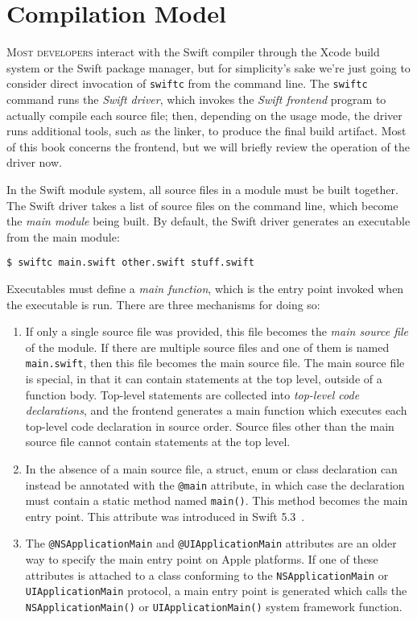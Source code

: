 \documentclass[../generics]{subfiles}
\begin{document}
\chapter{Compilation Model}\label{compilation model}

\lettrine{M}{ost developers} interact with the Swift compiler through the Xcode build system or the Swift package manager, but for simplicity's sake we're just going to consider direct invocation of \texttt{swiftc} from the command line. The \texttt{swiftc} command runs the \emph{Swift driver}, which invokes the \emph{Swift frontend} program to actually compile each source file; then, depending on the usage mode, the driver runs additional tools, such as the linker, to produce the final build artifact. Most of this book concerns the frontend, but we will briefly review the operation of the driver now.

In the Swift module system, all source files in a module must be built together. The Swift driver takes a list of source files on the command line, which become the \emph{main module} being built. By default, the Swift driver generates an executable from the main module:
\begin{Verbatim}
$ swiftc main.swift other.swift stuff.swift
\end{Verbatim}

Executables must define a \emph{main function}, which is the entry point invoked when the executable is run. There are three mechanisms for doing so:
\begin{enumerate}
\item If only a single source file was provided, this file becomes the \emph{main source file} of the module. If there are multiple source files and one of them is named \texttt{main.swift}, then this file becomes the main source file. The main source file is special, in that it can contain statements at the top level, outside of a function body. Top-level statements are collected into \emph{top-level code declarations}, and the frontend generates a main function which executes each top-level code declaration in source order. Source files other than the main source file cannot contain statements at the top level.
\item In the absence of a main source file, a struct, enum or class declaration can instead be annotated with the \texttt{@main} attribute, in which case the declaration must contain a static method named \texttt{main()}. This method becomes the main entry point. This attribute was introduced in Swift 5.3~\cite{se0281}.
\item The \texttt{@NSApplicationMain} and \texttt{@UIApplicationMain} attributes are an older way to specify the main entry point on Apple platforms. If one of these attributes is attached to a class conforming to the \texttt{NSApplicationMain} or \texttt{UIApplicationMain} protocol, a main entry point is generated which calls the \texttt{NSApplicationMain()} or \texttt{UIApplicationMain()} system framework function.
\end{enumerate}
\end{document}
